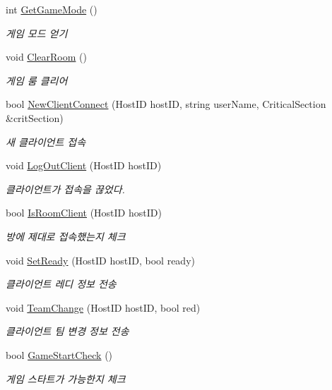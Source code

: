 \begin{DoxyCompactItemize}
int \hyperlink{class_game_room_a73929e8bd9390ea46513d7f4ed48dec1}{Get\+Game\+Mode} ()
\begin{DoxyCompactList}\small\item\em 게임 모드 얻기 \end{DoxyCompactList}\item 
void \hyperlink{class_game_room_a3dd806c7382efd9ffd353ab152113d69}{Clear\+Room} ()
\begin{DoxyCompactList}\small\item\em 게임 룸 클리어 \end{DoxyCompactList}\item 
bool \hyperlink{class_game_room_a498a6614e5ad025ff27f15e5571f2b2d}{New\+Client\+Connect} (Host\+ID host\+ID, string user\+Name, Critical\+Section \&crit\+Section)
\begin{DoxyCompactList}\small\item\em 새 클라이언트 접속 \end{DoxyCompactList}\item 
void \hyperlink{class_game_room_a4811bd3795a4f8130718bb7a9a2c4b0f}{Log\+Out\+Client} (Host\+ID host\+ID)
\begin{DoxyCompactList}\small\item\em 클라이언트가 접속을 끊었다. \end{DoxyCompactList}\item 
bool \hyperlink{class_game_room_a48687c02109ec932166223aa144c8c1f}{Is\+Room\+Client} (Host\+ID host\+ID)
\begin{DoxyCompactList}\small\item\em 방에 제대로 접속했는지 체크 \end{DoxyCompactList}\item 
void \hyperlink{class_game_room_ae1d0122ec800084f45041131fbb41da7}{Set\+Ready} (Host\+ID host\+ID, bool ready)
\begin{DoxyCompactList}\small\item\em 클라이언트 레디 정보 전송 \end{DoxyCompactList}\item 
void \hyperlink{class_game_room_a8cb9973b88d0b81c19e5cefac287a79e}{Team\+Change} (Host\+ID host\+ID, bool red)
\begin{DoxyCompactList}\small\item\em 클라이언트 팀 변경 정보 전송 \end{DoxyCompactList}\item 
bool \hyperlink{class_game_room_ac260821efc332ce039a4bd82aba5a828}{Game\+Start\+Check} ()
\begin{DoxyCompactList}\small\item\em 게임 스타트가 가능한지 체크 \end{DoxyCompactList}\item 

\end{DoxyCompactItemize}
